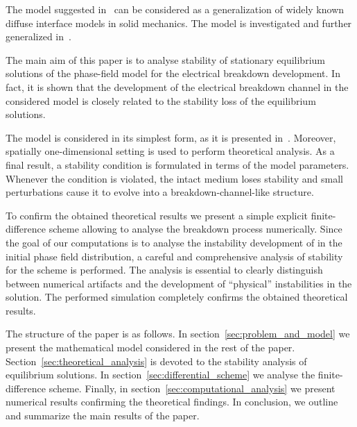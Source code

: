 The model suggested
in~\cite{pitike_dielectric_breakdown}
can be considered as a generalization of widely known diffuse
interface models in solid mechanics.
The model is investigated and further generalized in~\cite{zipunova_higher_codimension, zipunova_conservative,
zipunova_thermomechanical}.

The main aim of this paper is to analyse stability of
stationary equilibrium solutions of the phase-field model for the
electrical breakdown development.
In fact, it is shown that the development of the electrical breakdown channel
in the considered model is closely related to the stability loss of
the equilibrium solutions.

The model is considered in its simplest form, as it is presented
in~\cite{pitike_dielectric_breakdown}.
Moreover, spatially one-dimensional setting is used to perform
theoretical analysis. As a final result, a stability condition is
formulated in terms of the model parameters. Whenever the condition is
violated, the intact medium loses stability and small perturbations
cause it to evolve into a breakdown-channel-like structure.

To confirm the obtained theoretical results we present a simple explicit
finite-difference scheme allowing to analyse the breakdown process
numerically. Since the goal of our computations is to analyse the instability
development of in the initial phase field distribution,
a careful and comprehensive analysis of stability for the scheme is
performed. The analysis is essential to clearly distinguish between numerical
artifacts and the development of ``physical'' instabilities in the solution.
The performed simulation completely confirms the obtained theoretical
results.

The structure of the paper is as follows.
In section~\ref{sec:problem_and_model} we present the mathematical model
considered in the rest of the paper. Section~\ref{sec:theoretical_analysis} is
devoted to the stability analysis of equilibrium solutions. In
section~\ref{sec:differential_scheme} we analyse the finite-difference scheme. Finally, in
section~\ref{sec:computational_analysis} we present numerical results confirming the
theoretical findings. In conclusion, we outline and summarize the main results of the paper.

\endinput

